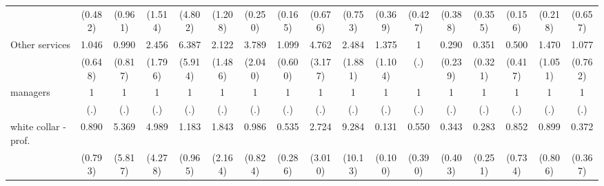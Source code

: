 {\begin{tabular}{l*{16}{c}}
                    &     (0.482)         &     (0.961)         &     (1.514)         &     (4.802)         &     (1.208)         &     (0.250)         &     (0.165)         &     (0.676)         &     (0.753)         &     (0.369)         &     (0.427)         &     (0.388)         &     (0.355)         &     (0.156)         &     (0.218)         &     (0.657)         \\
[1em]
Other services      &       1.046         &       0.990         &       2.456         &       6.387\sym{*}  &       2.122         &       3.789\sym{*}  &       1.099         &       4.762\sym{*}  &       2.484         &       1.375         &           1         &       0.290         &       0.351         &       0.500         &       1.470         &       1.077         \\
                    &     (0.648)         &     (0.817)         &     (1.796)         &     (5.914)         &     (1.486)         &     (2.040)         &     (0.600)         &     (3.177)         &     (1.881)         &     (1.104)         &         (.)         &     (0.239)         &     (0.321)         &     (0.417)         &     (1.051)         &     (0.762)         \\
[1em]
managers            &           1         &           1         &           1         &           1         &           1         &           1         &           1         &           1         &           1         &           1         &           1         &           1         &           1         &           1         &           1         &           1         \\
                    &         (.)         &         (.)         &         (.)         &         (.)         &         (.)         &         (.)         &         (.)         &         (.)         &         (.)         &         (.)         &         (.)         &         (.)         &         (.)         &         (.)         &         (.)         &         (.)         \\
[1em]
white collar - prof.&       0.890         &       5.369         &       4.989         &       1.183         &       1.843         &       0.986         &       0.535         &       2.724         &       9.284\sym{*}  &       0.131\sym{**} &       0.550         &       0.343         &       0.283         &       0.852         &       0.899         &       0.372         \\
                    &     (0.793)         &     (5.817)         &     (4.278)         &     (0.965)         &     (2.164)         &     (0.824)         &     (0.286)         &     (3.010)         &     (10.13)         &     (0.100)         &     (0.390)         &     (0.403)         &     (0.251)         &     (0.734)         &     (0.806)         &     (0.367)         \\

\end{tabular}}
